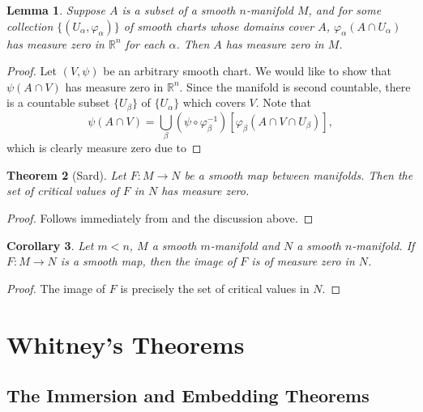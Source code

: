 \documentclass[11pt]{article}
\theoremstyle{thmstyle}
\newtheorem{theorem}{Theorem}[section]
\newtheorem{lemma}[theorem]{Lemma}
\theoremstyle{defstyle}
\newtheorem{corollary}[theorem]{Corollary}
\newcommand{\R}{\mathbb{R}}
\begin{document}
\begin{lemma}
	Suppose $A$ is a subset of a smooth $n$-manifold $M$, and for some collection $\{(U_\alpha, \varphi_\alpha)\}$ of smooth charts whose domains cover $A$, $\varphi_\alpha(A\cap U_\alpha)$ has measure zero in $\R^n$ for each $\alpha$. Then $A$ has measure zero in $M$.
\end{lemma}
\begin{proof}
	Let $(V,\psi)$ be an arbitrary smooth chart. We would like to show that $\psi(A\cap V)$ has measure zero in $\R^n$. Since the manifold is second countable, there is a countable subset $\{U_\beta\}$ of $\{U_\alpha\}$ which covers $V$. Note that 
	\begin{equation*}
		\psi(A\cap V) = \bigcup_\beta (\psi\circ\varphi_\beta^{-1})\left[\varphi_\beta\left(A\cap V\cap U_\beta\right)\right],
	\end{equation*}
	which is clearly measure zero due to 
\end{proof}

\begin{theorem}[Sard]
	Let $F\colon M\to N$ be a smooth map between manifolds. Then the set of critical values of $F$ in $N$ has measure zero.
\end{theorem}
\begin{proof}
	Follows immediately from  and the discussion above.
\end{proof}

\begin{corollary}
	Let $m < n$, $M$ a smooth $m$-manifold and $N$ a smooth $n$-manifold. If $F\colon M\to N$ is a smooth map, then the image of $F$ is of measure zero in $N$.
\end{corollary}
\begin{proof}
	The image of $F$ is precisely the set of critical values in $N$. 
\end{proof}

\section{Whitney's Theorems}

\subsection{The Immersion and Embedding Theorems}
\end{document}
